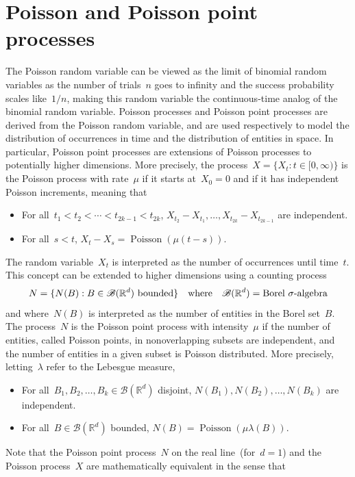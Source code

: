 \documentclass[letterpaper,11pt,twoside,keywordsasfootnote,addressatend,noinfoline]{article}
\newcommand{\R}{\mathbb{R}}
\newcommand{\B}{\mathscr{B}}
\DeclareMathOperator{\poisson}{Poisson}
\begin{document}
\section{Poisson and Poisson point processes}
 The Poisson random variable can be viewed as the limit of binomial random variables as the number of trials~$n$ goes to infinity and the success probability scales like~$1/n$, making this random variable the continuous-time analog of the binomial random variable.
 Poisson processes and Poisson point processes are derived from the Poisson random variable, and are used respectively to model the distribution of occurrences in time and the distribution of entities in space.
 In particular, Poisson point processes are extensions of Poisson processes to potentially higher dimensions.
 More precisely, the process~$X = \{X_t : t \in [0, \infty) \}$ is the Poisson process with rate~$\mu$ if it starts at~$X_0 = 0$ and if it has independent Poisson increments, meaning that
\begin{itemize}[leftmargin=36pt]
\item[(A1)] For all~$t_1 < t_2 < \cdots < t_{2k - 1} < t_{2k}$, $X_{t_2} - X_{t_1}, \ldots, X_{t_{2k}} - X_{t_{2k - 1}}$ are independent. \vspace*{4pt}
\item[(A2)] For all~$s < t$, $X_t - X_s = \poisson (\mu (t - s))$.
\end{itemize}
 The random variable~$X_t$ is interpreted as the number of occurrences until time~$t$.
 This concept can be extended to higher dimensions using a counting process
 $$ N = \{N (B) : B \in \B (\R^d) \ \hbox{bounded} \} \quad \hbox{where} \quad \B (\R^d) = \hbox{Borel~$\sigma$-algebra} $$
 and where~$N (B)$ is interpreted as the number of entities in the Borel set~$B$.
 The process~$N$ is the Poisson point process with intensity~$\mu$ if the number of entities, called Poisson points, in nonoverlapping subsets are independent, and the number of entities in a given subset is Poisson distributed.
 More precisely, letting~$\lambda$ refer to the Lebesgue measure,
\begin{itemize}[leftmargin=40pt]
\item[(A1')] For all~$B_1, B_2, \ldots, B_k \in \B (\R^d)$ disjoint, $N (B_1), N (B_2), \ldots, N (B_k)$ are independent. \vspace*{4pt}
\item[(A2')] For all~$B \in \B (\R^d)$ bounded, $N (B) = \poisson (\mu \lambda (B))$.
\end{itemize}
 Note that the Poisson point process~$N$ on the real line~(for~$d = 1$) and the Poisson process~$X$ are mathematically equivalent in the sense that
\end{document}
